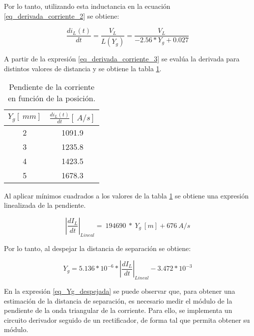 Por lo tanto, utilizando esta inductancia en la ecuación \ref{eq_derivada_corriente_2} se obtiene:

\begin{equation} \label{eq_derivada_corriente_3}
	\frac{di_L(t)}{dt}= \frac{V_L}{L(Y_g)}=\frac{V_L}{-2.56*Y_{g}+0.027}
\end{equation}

A partir de la expresión \ref{eq_derivada_corriente_3} se evalúa la derivada para distintos valores de distancia y se obtiene la tabla \ref{tab_derivada_linealizada}.

\begin{table}[H]
	\begin{center}
		\begin{tabular}{| c | c |}
			\hline
			$Y_g[\:mm]$ & $\frac{di_L(t)}{dt} [\:A/s]$\\ \hline
			2 & 1091.9 \\ \hline 
			3 & 1235.8 \\ \hline 
			4 & 1423.5 \\ \hline 
			5 & 1678.3 \\ \hline 
		\end{tabular}
		\caption{Pendiente de la corriente en función de la posición.}
		\label{tab_derivada_linealizada}
	\end{center}
\end{table}

Al aplicar mínimos cuadrados a los valores de la tabla \ref{tab_derivada_linealizada} se obtiene una expresión linealizada de la pendiente.


\begin{equation} \label{eq_di-dt_lineal}
	{\left|\frac{{dI}_L}{dt}\right|}_{Lineal}=\ 194690\ *\ Y_g\:[m]+676\:A/s
\end{equation}

Por lo tanto, al despejar la distancia de separación se obtiene:

\begin{equation} \label{eq_Yg_despejada}
	Y_g=5.136*10^{-6}*{\left|\frac{{dI}_L}{dt}\right|}_{Lineal} - 3.472*10^{-3}
\end{equation}


En la expresión \ref{eq_Yg_despejada} se puede observar que, para obtener una estimación de la distancia de separación, es necesario medir el módulo de la pendiente de la onda triangular de la corriente. Para ello, se implementa un circuito derivador seguido de un rectificador, de forma tal que permita obtener su módulo.


